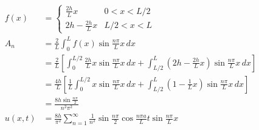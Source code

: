 \documentclass{article}
\begin{document}
\begin{align*}
  f(x)    & = \begin{cases}
                \frac{2 h}{L} x       & 0 < x < L / 2 \\
                2 h - \frac{2 h}{L} x & L / 2 < x < L
              \end{cases}                                                                                                                                     \\
  A_n     & = \frac{2}{L} \int_0^L f(x) \sin \frac{n \pi}{L} x \,d x                                                                                                                    \\
          & = \frac{2}{L} \left[ \int_0^{L / 2} \frac{2 h}{L} x \sin \frac{n \pi}{L} x \,d x + \int_{L / 2}^L \left( 2 h - \frac{2 h}{L} x \right) \sin \frac{n \pi}{L} x \,d x \right] \\
          & = \frac{4 h}{L} \left[ \frac{1}{L} \int_0^{L / 2} x \sin \frac{n \pi}{L} x \,d x + \int_{L / 2}^L \left( 1 - \frac{1}{L} x \right) \sin \frac{n \pi}{L} x \,d x \right]     \\
          & = \frac{8 h \sin \frac{n \pi}{2}}{n^2 \pi^2}                                                                                                                                \\
  u(x, t) & = \frac{8 h}{\pi^2} \sum_{n = 1}^\infty \frac{1}{n^2} \sin \frac{n \pi}{2} \cos \frac{n \pi a}{L} t \sin \frac{n \pi}{L} x
\end{align*}

\setcounter{subsubsection}{10}
\subsubsection{}
\end{document}
